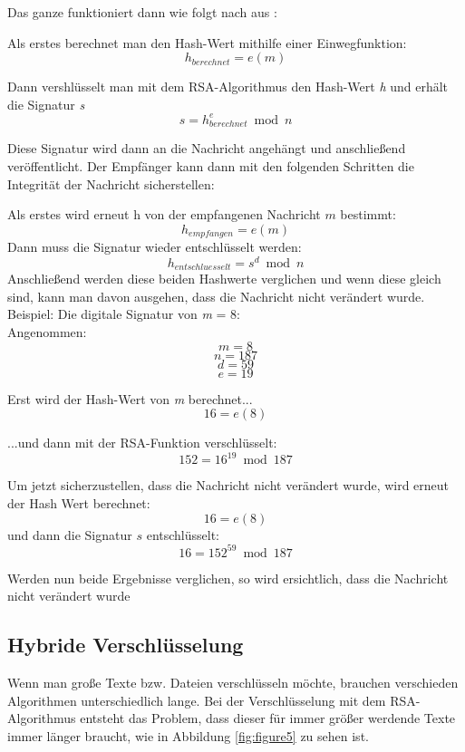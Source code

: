 \documentclass[12pt,a4paper]{scrartcl}
\begin{document}
Das ganze funktioniert dann wie folgt nach \citeauthor{Beutelspacher2015-jl} aus \cite[S.15f]{Beutelspacher2015-jl}:

Als erstes berechnet man den Hash-Wert mithilfe einer Einwegfunktion:
$$ {h_{berechnet} = e(m)} $$

Dann vershlüsselt man mit dem RSA-Algorithmus den Hash-Wert \textit{h} und erhält die Signatur \textit{s}
$$ {s = h_{berechnet}^e \bmod n} $$

Diese Signatur wird dann an die Nachricht angehängt und anschließend veröffentlicht.
Der Empfänger kann dann mit den folgenden Schritten die Integrität der Nachricht sicherstellen:

Als erstes wird erneut h von der empfangenen Nachricht $m$ bestimmt:
$${h_{empfangen} = e(m) }$$
Dann muss die Signatur wieder entschlüsselt werden:
$$ {h_{entschluesselt} = s^d \bmod n} $$
Anschließend werden diese beiden Hashwerte verglichen und wenn diese gleich sind, kann man davon ausgehen, dass die Nachricht nicht verändert wurde. \\


Beispiel: Die digitale Signatur von \textit{m} = 8:\\ 
Angenommen:
$${ \textit{m} = 8 }$$
$${ \textit{n} = 187 }$$
$${ \textit{d} = 59 }$$
$${ \textit{e} = 19 }$$


Erst wird der Hash-Wert von \textit{m} berechnet...
$$ {16 = e(8)} $$	

...und dann mit der RSA-Funktion verschlüsselt: %
$$ {152 = 16^{19} \bmod 187} $$	

Um jetzt sicherzustellen, dass die Nachricht nicht verändert wurde, wird erneut der Hash Wert berechnet:
$$ {16 = e(8)} $$	
und dann die Signatur $s$ entschlüsselt:
$$ {16 = 152^59 \bmod 187} $$

Werden nun beide Ergebnisse verglichen, so wird ersichtlich, dass die Nachricht nicht verändert wurde

	 	
	\subsection{Hybride Verschlüsselung}
		\label{cha:hybrid}
		
		
		Wenn man große Texte bzw. Dateien verschlüsseln möchte, brauchen verschieden Algorithmen unterschiedlich lange. Bei der Verschlüsselung mit dem RSA-Algorithmus entsteht das Problem, dass dieser für immer größer  werdende Texte immer länger braucht, wie in Abbildung \ref{fig:figure5} zu sehen ist.
\end{document}
